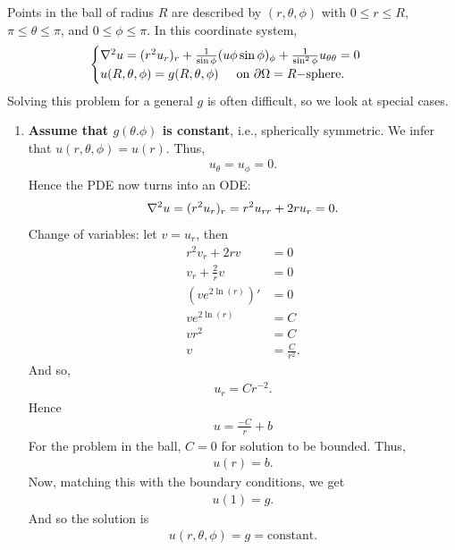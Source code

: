 \documentclass{article}
\theoremstyle{definition}
\newcommand{\p}{\partial}
\newcommand{\f}[2]{\frac{#1}{#2}}
\newcommand{\lp}{\left(}
\newcommand{\rp}{\right)}
\begin{document}
Points in the ball of radius $R$ are described by $(r,\theta,\phi)$ with $0 \leq r \leq R$, $\pi \leq \theta \leq \pi$, and $0 \leq \phi \leq \pi$. In this coordinate system,
\begin{align*}
\begin{cases}
\laplacian u = (r^2 u_r)_r  + \f{1}{\sin\phi}(u\phi \sin\phi )_\phi + \f{1}{\sin^2\phi}u_{\theta\theta} = 0\\
u(R,\theta,\phi) = g(R,\theta,\phi)\hspace{0.5cm} \text{on $\p \Omega = R-$sphere}.
\end{cases}
\end{align*}
Solving this problem for a general $g$ is often difficult, so we look at special cases. 

\begin{enumerate}
	\item \textbf{Assume that $g(\theta.\phi)$ is constant}, i.e., spherically symmetric. We infer that $u(r,\theta,\phi) = u(r)$. Thus, 
	\begin{align*}
	u_\theta = u_\phi = 0.
	\end{align*}
	Hence the PDE now turns into an ODE:
	\begin{align*}
	\laplacian u = (r^2 u_r)_r = r^2 u_{rr} + 2ru_r = 0.
	\end{align*}
	Change of variables: let $v = u_r$, then
	\begin{align*}
	r^2 v_r + 2rv &= 0\\
	v_r + \f{2}{r}v &= 0\\
	\lp ve^{2\ln(r)}\rp' &= 0\\
	ve^{2\ln(r)} &= C\\
	vr^2 &= C\\
	v &= \f{C}{r^2}.
	\end{align*}
	And so,
	\begin{align*}
	u_r = Cr^{-2}.
	\end{align*}
	Hence
	\begin{align*}
	\boxed{u = \f{-C}{r} + b}
	\end{align*}
	For the problem in the ball, $C = 0$ for solution to be bounded. Thus,
	\begin{align*}
	u(r) = b.
	\end{align*}
	Now, matching this with the boundary conditions, we get
	\begin{align*}
	u(1) = g.
	\end{align*}
	And so the solution is
	\begin{align*}
	u(r,\theta,\phi) = g = \text{constant}. 

\end{align*}
\end{enumerate}
\end{document}
